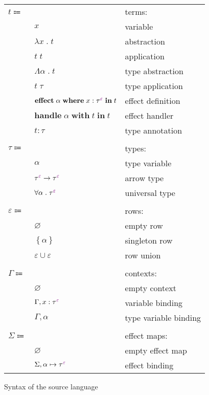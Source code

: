 \documentclass[12pt]{article}
\newcommand\anno[2]{#1 : #2}
\newcommand\term{t}
\newcommand\eVar{x}
\newcommand\eAbs[2]{\lambda #1 \; . \; #2}
\newcommand\eApp[2]{#1 \; #2}
\newcommand\eTAbs[2]{\Lambda #1 \; . \; #2}
\newcommand\eTApp[2]{#1 \; #2}
\newcommand\eHandle[3]{\textbf{handle} \; #1 \; \textbf{with} \; #2 \; \textbf{in} \; #3}
\newcommand\eEffect[5]{\textbf{effect} \; #1 \; \textbf{where} \; \anno{#2}{\tEmbellished{#3}{#4}} \; \textbf{in} \; #5}
\newcommand\eAnno[2]{\anno{#1}{#2}}
\newcommand\type{\tau}
\newcommand\tVar{\alpha}
\newcommand\tArrow[4]{\tEmbellished{#1}{#2} \rightarrow \tEmbellished{#3}{#4}}
\newcommand\tForall[3]{\forall #1 \; . \; \tEmbellished{#2}{#3}}
\newcommand\tEmbellished[2]{{#1}^{\textcolor{violet}{#2}}}
\newcommand\row{\varepsilon}
\newcommand\rEmpty{\varnothing}
\newcommand\rSingleton[1]{\left\{ #1 \right\}}
\newcommand\rUnion[2]{#1 \cup #2}
\newcommand\context{\Gamma}
\newcommand\cEmpty{\varnothing}
\newcommand\cTExtend[4]{#1, \anno{#2}{\tEmbellished{#3}{#4}}}
\newcommand\cKExtend[2]{#1, #2}
\newcommand\effectMap{\Sigma}
\newcommand\emEmpty{\varnothing}
\newcommand\emExtend[4]{#1, #2 \mapsto \tEmbellished{#3}{#4}}
\begin{document}
        \begin{figure}[H]
          \begin{mdframed}[backgroundcolor=none]
            \begin{center}
              \begin{tabular}{l l l}
                $\term \Coloneqq$ & & terms: \\
                & $\eVar$ & variable \\
                & $\eAbs{\eVar}{\term}$ & abstraction \\
                & $\eApp{\term}{\term}$ & application \\
                & $\eTAbs{\tVar}{\term}$ & type abstraction \\
                & $\eTApp{\term}{\type}$ & type application \\
                & $\eEffect{\tVar}{\eVar}{\type}{\row}{\term}$ & effect definition \\
                & $\eHandle{\tVar}{\term}{\term}$ & effect handler \\
                & $\eAnno{\term}{\type}$ & type annotation \\
                \\
                $\type \Coloneqq$ & & types: \\
                & $\tVar$ & type variable \\
                & $\tArrow{\type}{\row}{\type}{\row}$ & arrow type \\
                & $\tForall{\tVar}{\type}{\row}$ & universal type \\
                \\
                $\row \Coloneqq$ & & rows: \\
                & $\rEmpty$ & empty row \\
                & $\rSingleton{\tVar}$ & singleton row \\
                & $\rUnion{\row}{\row}$ & row union \\
                \\
                $\context \Coloneqq$ & & contexts: \\
                & $\cEmpty$ & empty context \\
                & $\cTExtend{\context}{\eVar}{\type}{\row}$ & variable binding \\
                & $\cKExtend{\context}{\tVar}$ & type variable binding \\
                \\
                $\effectMap \Coloneqq$ & & effect maps: \\
                & $\emEmpty$ & empty effect map \\
                & $\emExtend{\effectMap}{\tVar}{\type}{\row}$ & effect binding \\
              \end{tabular}
            \end{center}

            \caption{Syntax of the source language}\label{fig:source_syntax}
          \end{mdframed}
        \end{figure}
\end{document}
